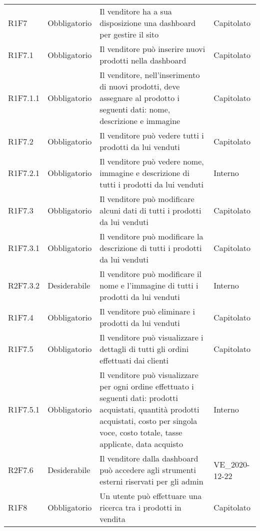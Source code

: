 {\begin{longtable}{C{2.5cm} C{2.8cm} C{6.7cm} C{2.5cm}}
R1F7 & Obbligatorio & Il venditore ha a sua disposizione una dashboard per gestire il sito & Capitolato \\
R1F7.1 & Obbligatorio & Il venditore può inserire nuovi prodotti nella dashboard & Capitolato \\
R1F7.1.1 & Obbligatorio & Il venditore, nell'inserimento di nuovi prodotti, deve assegnare al prodotto i seguenti dati: nome, descrizione e immagine & Capitolato \\
R1F7.2 & Obbligatorio & Il venditore può vedere tutti i prodotti da lui venduti & Capitolato \\
R1F7.2.1 & Obbligatorio & Il venditore può vedere nome, immagine e descrizione di tutti i prodotti da lui venduti & Interno \\
R1F7.3 & Obbligatorio & Il venditore può modificare alcuni dati di tutti i prodotti da lui venduti & Capitolato \\
R1F7.3.1 & Obbligatorio & Il venditore può modificare la descrizione di tutti i prodotti da lui venduti & Capitolato \\
R2F7.3.2 & Desiderabile & Il venditore può modificare il nome e l'immagine di tutti i prodotti da lui venduti & Interno \\
R1F7.4 & Obbligatorio & Il venditore può eliminare i prodotti da lui venduti & Capitolato \\
R1F7.5 & Obbligatorio & Il venditore può visualizzare i dettagli di tutti gli ordini effettuati dai clienti & Capitolato \\
R1F7.5.1 & Obbligatorio & Il venditore può visualizzare per ogni ordine effettuato i seguenti dati: prodotti acquistati, quantità prodotti acquistati, costo per singola voce, costo totale, tasse applicate, data acquisto & Interno \\
R2F7.6 & Desiderabile & Il venditore dalla dashboard può accedere agli strumenti esterni riservati per gli admin & VE\_2020-12-22 \\


R1F8 & Obbligatorio & Un utente può effettuare una ricerca tra i prodotti in vendita & Capitolato \\



\end{longtable}}
